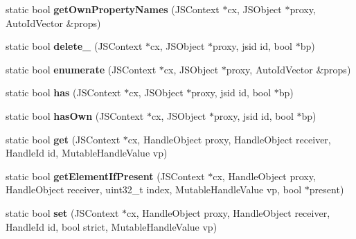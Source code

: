 \begin{DoxyCompactItemize}
\item 
\hypertarget{classjs_1_1_proxy_ad826e338e428959ee805ec57911d0325}{static bool {\bfseries get\-Own\-Property\-Names} (J\-S\-Context $\ast$cx, J\-S\-Object $\ast$proxy, Auto\-Id\-Vector \&props)}\label{classjs_1_1_proxy_ad826e338e428959ee805ec57911d0325}

\item 
\hypertarget{classjs_1_1_proxy_aed0b92b233ae191b8f855fd6f8511b22}{static bool {\bfseries delete\-\_\-} (J\-S\-Context $\ast$cx, J\-S\-Object $\ast$proxy, jsid id, bool $\ast$bp)}\label{classjs_1_1_proxy_aed0b92b233ae191b8f855fd6f8511b22}

\item 
\hypertarget{classjs_1_1_proxy_a4d7f3daf219b49dd1c7874241dc7c13d}{static bool {\bfseries enumerate} (J\-S\-Context $\ast$cx, J\-S\-Object $\ast$proxy, Auto\-Id\-Vector \&props)}\label{classjs_1_1_proxy_a4d7f3daf219b49dd1c7874241dc7c13d}

\item 
\hypertarget{classjs_1_1_proxy_a2398c97454809e8d209f23b15b0d0e39}{static bool {\bfseries has} (J\-S\-Context $\ast$cx, J\-S\-Object $\ast$proxy, jsid id, bool $\ast$bp)}\label{classjs_1_1_proxy_a2398c97454809e8d209f23b15b0d0e39}

\item 
\hypertarget{classjs_1_1_proxy_a0249d71d32bb8b87ae2ac7e0a6ba84d6}{static bool {\bfseries has\-Own} (J\-S\-Context $\ast$cx, J\-S\-Object $\ast$proxy, jsid id, bool $\ast$bp)}\label{classjs_1_1_proxy_a0249d71d32bb8b87ae2ac7e0a6ba84d6}

\item 
\hypertarget{classjs_1_1_proxy_ad3875c8f47ad412f80c6d3cb56bdd0c7}{static bool {\bfseries get} (J\-S\-Context $\ast$cx, Handle\-Object proxy, Handle\-Object receiver, Handle\-Id id, Mutable\-Handle\-Value vp)}\label{classjs_1_1_proxy_ad3875c8f47ad412f80c6d3cb56bdd0c7}

\item 
\hypertarget{classjs_1_1_proxy_a20a84e34931fab47c2ad2036b9aa5148}{static bool {\bfseries get\-Element\-If\-Present} (J\-S\-Context $\ast$cx, Handle\-Object proxy, Handle\-Object receiver, uint32\-\_\-t index, Mutable\-Handle\-Value vp, bool $\ast$present)}\label{classjs_1_1_proxy_a20a84e34931fab47c2ad2036b9aa5148}

\item 
\hypertarget{classjs_1_1_proxy_a378ba638f51cc1979ccd67085b14f93f}{static bool {\bfseries set} (J\-S\-Context $\ast$cx, Handle\-Object proxy, Handle\-Object receiver, Handle\-Id id, bool strict, Mutable\-Handle\-Value vp)}\label{classjs_1_1_proxy_a378ba638f51cc1979ccd67085b14f93f}


\end{DoxyCompactItemize}

